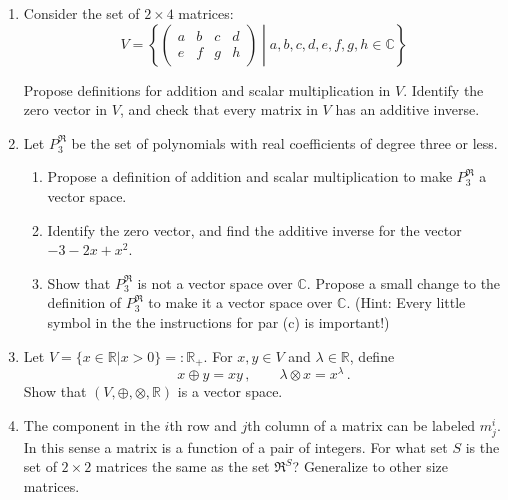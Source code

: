 \begin{enumerate}
\vspace{5mm}

\item Consider the set of $2\times 4$ matrices:
\[ V = \left\{ 
\begin{pmatrix}
a & b & c & d \\
e & f & g & h 
\end{pmatrix}
\middle| a,b,c,d,e,f,g,h \in \mathbb{C} \right\}
\]

Propose definitions for addition and scalar multiplication in $V$.  Identify the zero vector in $V$, and check that every matrix in $V$ has an additive inverse.  

\vspace{5mm}

\item \label{problem_polynomials} Let $P_3^{\Re}$ be the set of polynomials with real coefficients of degree three or less.
	\begin{enumerate}
	\item Propose a definition of addition and scalar multiplication to make $P_3^{\Re}$ a vector space.

	\item Identify the zero vector, and find the additive inverse for the vector $-3-2x+x^2$.

	\item Show that $P_3^{\Re}$ is not a vector space over $\mathbb{C}$.  Propose a small change to the definition of $P_3^{\Re}$ to make it a vector space over $\mathbb{C}$. (Hint: Every little symbol in the the instructions for par (c) is important!)
\end{enumerate}


\item Let $V=\{x\in {\mathbb R}|x>0\}=:{\mathbb R}_+$. For $x,y\in V$ and $\lambda\in {\mathbb R}$, define
\[
x\oplus y = xy\, ,\qquad \lambda \otimes x = x^\lambda\, .
\]
Show that $(V,\oplus,\otimes,{\mathbb R})$ is a vector space.

\item The component in the $i$th row and $j$th column of a matrix can be labeled $m^i_{j}$. In this sense a matrix is a function of a pair of integers. For what set $S$ is the set of  $2\times2$ matrices the same as the set $\Re^S$? Generalize to other size matrices. 


\end{enumerate}
